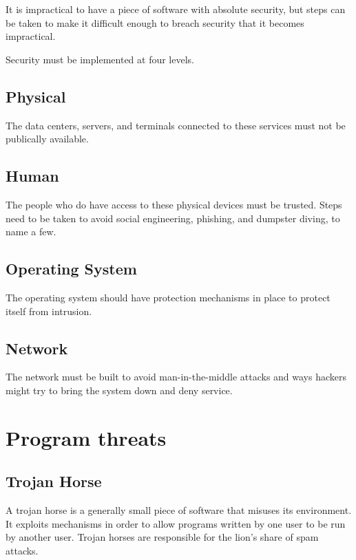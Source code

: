 \documentclass{article}
\begin{document}
It is impractical to have a piece of software with absolute security, but steps
can be taken to make it difficult enough to breach security that it becomes
impractical.

Security must be implemented at four levels.

\subsection{Physical}

The data centers, servers, and terminals connected to these services must not
be publically available.

\subsection{Human}

The people who do have access to these physical devices must be trusted. Steps
need to be taken to avoid social engineering, phishing, and dumpster diving, to
name a few.

\subsection{Operating System}

The operating system should have protection mechanisms in place to protect
itself from intrusion.

\subsection{Network}

The network must be built to avoid man-in-the-middle attacks and ways hackers
might try to bring the system down and deny service.

\section{Program threats}

\subsection{Trojan Horse}

A trojan horse is a generally small piece of software that misuses its
environment. It exploits mechanisms in order to allow programs written by one
user to be run by another user. Trojan horses are responsible for the lion's
share of spam attacks.
\end{document}

